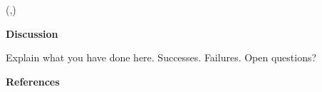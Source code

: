 \documentclass[dark]{cgem-poster}
\begin{document}
\begin{textblock*}{\PosterColumnThreeTextWidth{}}(\PosterColumnThreeTextLeft{},\PosterColumnThreeTextTop{})
  \begin{minipage}[t][\PosterColumnThreeTextHeight{}][t]{\PosterColumnThreeTextWidth{}}
    \vspace{5mm}
    \begin{center}
      \large
      \textbf{Discussion}
    \end{center}

    \vspace{5mm}
    \small
    Explain what you have done here. %
    Successes. Failures. Open questions?

    \vspace{50cm}
    \PosterColumnHorizontalBar{}
    \begin{center}
      \large
      \textbf{References}
    \end{center}

    \renewcommand*{\bibfont}{\small}
    \printbibliography

  \end{minipage}
\end{textblock*}
\end{document}
